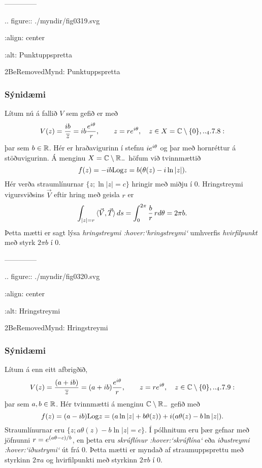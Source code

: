 --------------





.. figure:: ./myndir/fig0319.svg

    :align: center

    :alt: Punktuppspretta

    2BeRemovedMynd: Punktuppspretta




\subsubsection{Sýnidæmi}  Lítum nú á fallið $V$ sem gefið er með 
 \begin{equation*}V(z)=\dfrac {ib}{\overline z}= ib\dfrac {e\sp{i\theta}}r, \qquad
z=re\sp{i\theta}, \quad z\in X=\C\setminus\set 0,


.. _4.7.8:

 \end{equation*}
þar sem $b\in {\mathbb R}$.
Hér er hraðavigurinn í stefnu $ie\sp{i\theta}$ og þar með hornréttur
á stöðuvigurinn.  {Á}  menginu $X={\mathbb C}\setminus {\mathbb R}_-$ 
höfum við tvinnmættið  
 $$f(z)=-ib{\operatorname{Log}} z=b(\theta(z)-i\ln |z|).
 $$
Hér verða straumlínurnar $\{z; \ln|z|=c\}$ hringir  með miðju í
$0$.  Hringstreymi vigursviðsins $\vec V$ eftir hring með geisla $r$
er
 $$\int_{|z|=r}{\langle\vec V,\vec T\rangle} \, ds=
\int_0\sp{2\pi}\dfrac br \, rd\theta=2\pi b.
 $$
Þetta mætti er sagt lýsa {\it hringstreymi :hover:`hringstreymi`}
umhverfis {\it hvirfilpunkt} með styrk $2\pi b$ í $0$.

{}


--------------




.. figure:: ./myndir/fig0320.svg

    :align: center

    :alt: Hringstreymi

    2BeRemovedMynd: Hringstreymi



\subsubsection{Sýnidæmi} Lítum á enn eitt afbrigðið, 
 \begin{equation*}V(z)=\dfrac {(a+ib)}{\overline z}= (a+ib)\dfrac {e\sp{i\theta}}r, \qquad
z=re\sp{i\theta}, \quad z\in \C\setminus\set 0,


.. _4.7.9:

 \end{equation*}
þar sem $a,b\in {\mathbb R}$.
Hér tvinnmætti á menginu ${\mathbb C}\setminus {\mathbb R}_-$ gefið með
 $$f(z)=(a-ib){\operatorname{Log}} z=(a\ln |z| + b\theta(z))+i(a\theta(z)-b\ln |z|).
 $$
Straumlínurnar eru $\{z;a\theta(z)-b\ln |z|=c\}$.  Í pólhnitum
eru þær gefnar með jöfnunni $r=e\sp{(a\theta-c)/b}$, en þetta eru
{\it skrúflínur :hover:`skrúflína`}  eða {\it iðustreymi :hover:`iðustrymi`} 
út frá $0$.  Þetta mætti er myndað af straumuppsprettu með
styrkinn $2\pi a$ og  hvirfilpunkti með styrkinn $2\pi b$ í $0$.


